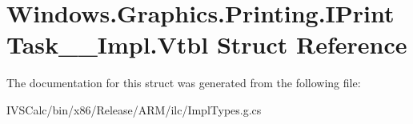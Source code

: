 \hypertarget{struct_windows_1_1_graphics_1_1_printing_1_1_i_print_task_____impl_1_1_vtbl}{}\section{Windows.\+Graphics.\+Printing.\+I\+Print\+Task\+\_\+\+\_\+\+Impl.\+Vtbl Struct Reference}
\label{struct_windows_1_1_graphics_1_1_printing_1_1_i_print_task_____impl_1_1_vtbl}


The documentation for this struct was generated from the following file\+:\begin{DoxyCompactItemize}
\item 
I\+V\+S\+Calc/bin/x86/\+Release/\+A\+R\+M/ilc/Impl\+Types.\+g.\+cs\end{DoxyCompactItemize}
